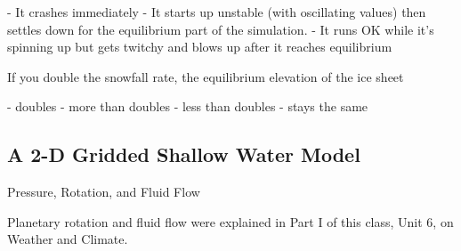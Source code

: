 - It crashes immediately
- It starts up unstable (with oscillating values) then settles down for the equilibrium part of the simulation.
- It runs OK while it's spinning up but gets twitchy and blows up after it reaches equilibrium

If you double the snowfall rate, the equilibrium elevation of the ice sheet

 - doubles
 - more than doubles
 - less than doubles
 - stays the same

\subsection{A 2-D Gridded Shallow Water Model}
Pressure, Rotation, and Fluid Flow

Planetary rotation and fluid flow were explained in Part I of this class, Unit 6, on Weather and Climate.

